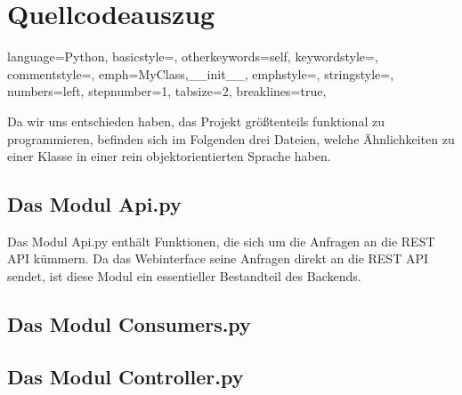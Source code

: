 \section{Quellcodeauszug}


\lstset
{
    language=Python,
    basicstyle=\footnotesize,
    otherkeywords={self},             %
    keywordstyle=\color{deepblue},
    commentstyle=\color{string-color},
    emph={MyClass,__init__},          %
    emphstyle=\color{deepred},    %
    stringstyle=\color{deepgreen},
    numbers=left,
    stepnumber=1,
    tabsize=2,
    breaklines=true,
}

Da wir uns entschieden haben, das Projekt größtenteils funktional zu programmieren, befinden sich im Folgenden
drei Dateien, welche Ähnlichkeiten zu einer Klasse in einer rein objektorientierten Sprache
haben.

\subsection{Das Modul Api.py}
Das Modul Api.py enthält Funktionen, die sich um die Anfragen an die REST API kümmern. 
Da das Webinterface seine Anfragen direkt an die REST API sendet, ist diese Modul ein essentieller
Bestandteil des Backends.


\subsection{Das Modul Consumers.py}



\subsection{Das Modul Controller.py}


